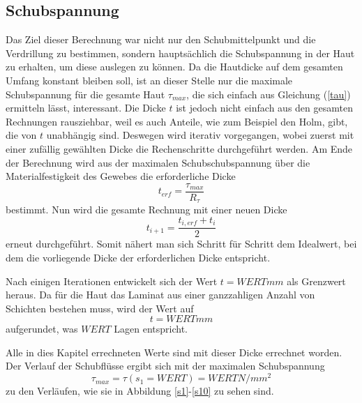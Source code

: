 \subsection{Schubspannung}
Das Ziel dieser Berechnung war nicht nur den Schubmittelpunkt und die Verdrillung zu bestimmen, sondern hauptsächlich die Schubspannung in der Haut zu erhalten, um diese auslegen zu können. Da die Hautdicke auf dem gesamten Umfang konstant bleiben soll, ist an dieser Stelle nur die maximale Schubspannung für die gesamte Haut $\tau_{max}$, die sich einfach aus Gleichung (\ref{tau}) ermitteln lässt, interessant. Die Dicke $t$ ist jedoch nicht einfach aus den gesamten Rechnungen rausziehbar, weil es auch Anteile, wie zum Beispiel den Holm, gibt, die von $t$ unabhängig sind. Deswegen wird iterativ vorgegangen, wobei zuerst mit einer zufällig gewählten Dicke die Rechenschritte durchgeführt werden. Am Ende der Berechnung wird aus der maximalen Schubschubspannung über die Materialfestigkeit des Gewebes die erforderliche Dicke \begin{equation}
	t_{erf} = \frac{\tau_{max}}{R_{\tau}}
\end{equation} bestimmt. Nun wird die gesamte Rechnung mit einer neuen Dicke
\begin{equation}
	t_{i+1} =\frac{t_{i,erf}+t_{i}}{2}
\end{equation}
erneut durchgeführt. Somit nähert man sich Schritt für Schritt dem Idealwert, bei dem die vorliegende Dicke der erforderlichen Dicke entspricht.

Nach einigen Iterationen entwickelt sich der Wert $t = WERT mm$ als Grenzwert heraus. Da für die Haut das Laminat aus einer ganzzahligen Anzahl von Schichten bestehen muss, wird der Wert auf 
\begin{equation}
	t = WERT mm
\end{equation}
aufgerundet, was $WERT$ Lagen entspricht.

Alle in dies Kapitel errechneten Werte sind mit dieser Dicke errechnet worden. Der Verlauf der Schubflüsse ergibt sich mit der maximalen Schubspannung
\begin{equation}
\tau_{max}=\tau(s_1=WERT)=WERT N/mm^2
\end{equation}
zu den Verläufen, wie sie in Abbildung \ref{s1}-\ref{s10} zu sehen sind.








